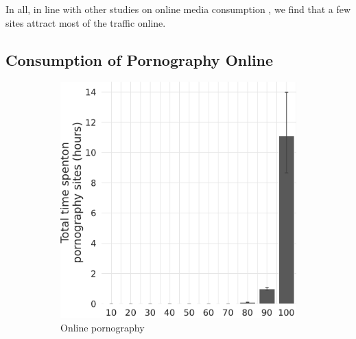 \documentclass[12pt,twoside]{article}
\begin{document}
In all, in line with other studies on online media consumption \citep{Dewan2004-tt, hindman2009myth, webporn}, we find that a few sites attract most of the traffic online.

\subsection{Consumption of Pornography Online}
\label{subsec:concentration_in_porn}

\begin{figure}[!ht]
     \centering
     \begin{subfigure}[b]{0.495\textwidth}
         \centering
         \includegraphics[width=\textwidth]{figs/distribution_duration_on_adultsites_fullsample.pdf}
         \caption{Online pornography}
     \end{subfigure}
     \hfill
     \begin{subfigure}[b]{0.495\textwidth}
         \centering

\end{subfigure}
\end{figure}
\end{document}
